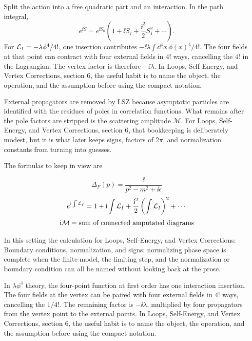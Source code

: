 Split the action into a free quadratic part and an interaction.  In the path integral,
\[
  e^{\ii S}=e^{\ii S_0}\left(1+\ii S_I+\frac{\ii^2}{2}S_I^2+\cdots\right).
\]
For \(\mathcal L_I=-\lambda\phi^4/4!\), one insertion contributes \(-\ii\lambda\int\dd^4x\,\phi(x)^4/4!\).  The four fields at that point can contract with four external fields in \(4!\) ways, cancelling the \(4!\) in the Lagrangian.  The vertex factor is therefore \(-\ii\lambda\).  In Loops, Self-Energy, and Vertex Corrections, section 6, the useful habit is to name the object, the operation, and the assumption before using the compact notation.

External propagators are removed by LSZ because asymptotic particles are identified with the residues of poles in correlation functions.  What remains after the pole factors are stripped is the scattering amplitude \(\mathcal M\).  For Loops, Self-Energy, and Vertex Corrections, section 6, that bookkeeping is deliberately modest, but it is what later keeps signs, factors of \(2\pi\), and normalization constants from turning into guesses.

The formulas to keep in view are

\[
  \Delta_F(p)=\frac{\ii}{p^2-m^2+\ii\epsilon}
\]
\[
  e^{\mathrm i\int\mathcal L_I}=1+\mathrm i\int\mathcal L_I+\frac{\mathrm i^2}{2}\left(\int\mathcal L_I\right)^2+\cdots
\]
\[
  \mathrm i\mathcal M=\hbox{sum of connected amputated diagrams}
\]

In this setting the calculation for Loops, Self-Energy, and Vertex Corrections: Boundary conditions, normalization, and signs: normalizing phase space is complete when the finite model, the limiting step, and the normalization or boundary condition can all be named without looking back at the prose.




\begin{example}
In \(\lambda\phi^4\) theory, the four-point function at first order has one interaction insertion.  The four fields at the vertex can be paired with four external fields in \(4!\) ways, cancelling the \(1/4!\).  The remaining factor is \(-\ii\lambda\), multiplied by four propagators from the vertex point to the external points.  In Loops, Self-Energy, and Vertex Corrections, section 6, the useful habit is to name the object, the operation, and the assumption before using the compact notation.
\end{example}



